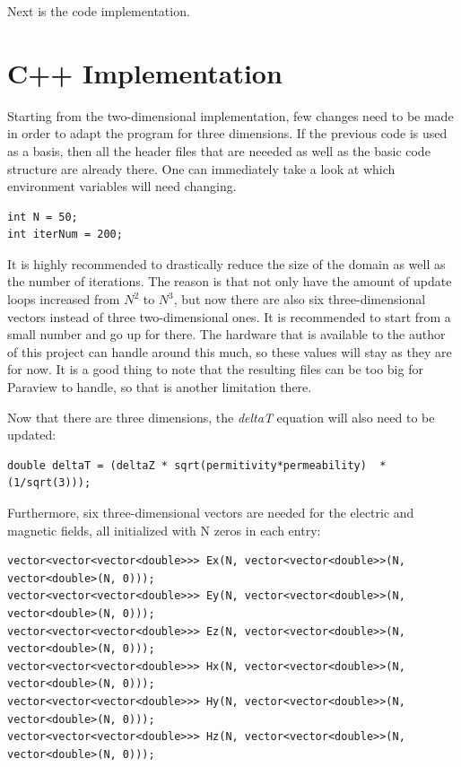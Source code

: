 Next is the code implementation.


\section{C++ Implementation}

Starting from the two-dimensional implementation, few changes need to be made in order to adapt the program for three dimensions. If the previous code is used as a basis, then all the header files that are neeeded as well as the basic code structure are already there. One can immediately take a look at which environment variables will need changing.

\begin{verbatim}
int N = 50;
int iterNum = 200;
\end{verbatim}

It is highly recommended to drastically reduce the size of the domain as well as the number of iterations. The reason is that not only have  the amount of update loops increased from $N^2$ to $N^3$, but now there are also six three-dimensional vectors instead of three two-dimensional ones. It is recommended to start from a small number and go up for there. The hardware that is available to the author of this project can handle around this much, so these values will stay as they are for now. It is a good thing to note that the resulting files can be too big for Paraview to handle, so that is another limitation there.

Now that there are three dimensions, the \textit{deltaT} equation will also need to be updated:

\begin{verbatim}
double deltaT = (deltaZ * sqrt(permitivity*permeability)  * (1/sqrt(3)));
\end{verbatim}

Furthermore, six three-dimensional vectors are needed for the electric and magnetic fields, all initialized with N zeros in each entry:

\begin{verbatim}
vector<vector<vector<double>>> Ex(N, vector<vector<double>>(N, vector<double>(N, 0)));
vector<vector<vector<double>>> Ey(N, vector<vector<double>>(N, vector<double>(N, 0)));
vector<vector<vector<double>>> Ez(N, vector<vector<double>>(N, vector<double>(N, 0)));
vector<vector<vector<double>>> Hx(N, vector<vector<double>>(N, vector<double>(N, 0)));
vector<vector<vector<double>>> Hy(N, vector<vector<double>>(N, vector<double>(N, 0)));
vector<vector<vector<double>>> Hz(N, vector<vector<double>>(N, vector<double>(N, 0)));
\end{verbatim}

